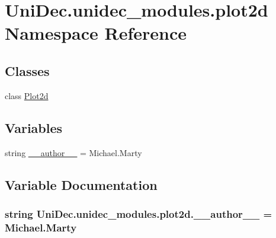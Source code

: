 \hypertarget{namespace_uni_dec_1_1unidec__modules_1_1plot2d}{}\section{Uni\+Dec.\+unidec\+\_\+modules.\+plot2d Namespace Reference}
\label{namespace_uni_dec_1_1unidec__modules_1_1plot2d}
\subsection*{Classes}
\begin{DoxyCompactItemize}
\item 
class \hyperlink{class_uni_dec_1_1unidec__modules_1_1plot2d_1_1_plot2d}{Plot2d}
\end{DoxyCompactItemize}
\subsection*{Variables}
\begin{DoxyCompactItemize}
\item 
string \hyperlink{namespace_uni_dec_1_1unidec__modules_1_1plot2d_a9273bfe18dad0b458711b7ba63bd1535}{\+\_\+\+\_\+author\+\_\+\+\_\+} = \textquotesingle{}Michael.\+Marty\textquotesingle{}
\end{DoxyCompactItemize}


\subsection{Variable Documentation}
\hypertarget{namespace_uni_dec_1_1unidec__modules_1_1plot2d_a9273bfe18dad0b458711b7ba63bd1535}{}
\subsubsection[{\+\_\+\+\_\+author\+\_\+\+\_\+}]{\setlength{\rightskip}{0pt plus 5cm}string Uni\+Dec.\+unidec\+\_\+modules.\+plot2d.\+\_\+\+\_\+author\+\_\+\+\_\+ = \textquotesingle{}Michael.\+Marty\textquotesingle{}}\label{namespace_uni_dec_1_1unidec__modules_1_1plot2d_a9273bfe18dad0b458711b7ba63bd1535}
